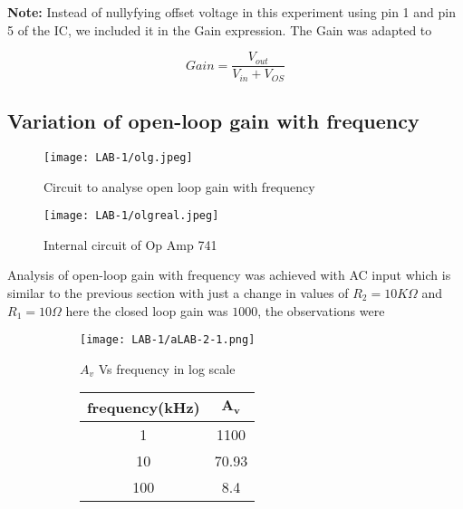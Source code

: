 \documentclass[12pt]{article}
\begin{document}
      \textbf{Note:} Instead of nullyfying offset voltage in this experiment using pin 1 and pin 5 of the IC, we included it in the Gain expression. The Gain was adapted to 
      
      \begin{equation}
          Gain = \frac{V_{out}}{V_{in} + V_{OS}}
      \end{equation}
       
      \subsection{Variation of open-loop gain with frequency}
        \begin{figure}[H]
            \centering
            \texttt{[image: LAB-1/olg.jpeg]}
            \caption{Circuit to analyse open loop gain with frequency}
        \end{figure}
        \begin{figure}[H]
          \centering
          \texttt{[image: LAB-1/olgreal.jpeg]}
            \caption{Internal circuit of Op Amp 741}
        \end{figure}
      Analysis of open-loop gain with frequency was achieved with AC input which is similar to the previous section with just a change in values of $R_2 = 10K\Omega$ and $R_1 = 10\Omega$ here the closed loop gain was $1000$, the observations were
        
        \begin{figure}[H]
        
            \begin{subfigure}{0.75\linewidth}
                \centering
                \texttt{[image: LAB-1/aLAB-2-1.png]}
                \caption{$A_v$ Vs frequency in log scale}
            \end{subfigure}
            \begin{subfigure}{0.1\linewidth}
                \centering
                \begin{tabular}{|c|c|}
                   \hline
                     \bfseries frequency(kHz) & $\mathbf{A_v}$ \\ \hline
                     1  & 1100 \\ \hline
                     10  & 70.93 \\ \hline
                     100  & 8.4 \\ \hline
                \end{tabular}
            \end{subfigure}
        \end{figure}
        
\end{document}
